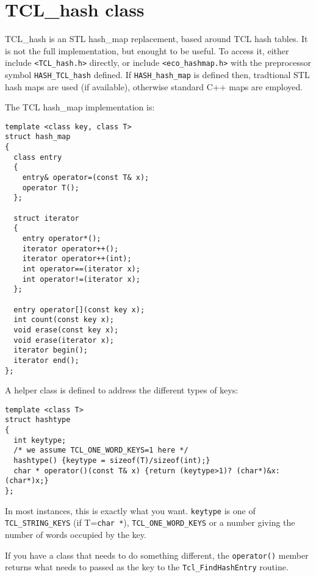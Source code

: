 \section{TCL_hash class}

TCL_hash is an
STL hash_map replacement, based around TCL hash tables. It is not the
full implementation, but enought to be useful. To access it, either
include \verb+<TCL_hash.h>+ directly, or include
\verb+<eco_hashmap.h>+ with the preprocessor symbol
\verb+HASH_TCL_hash+ defined. If \verb+HASH_hash_map+ is defined then,
tradtional STL hash maps are used (if available), otherwise standard
C++ maps are employed.

The TCL hash\_map implementation is:
\begin{verbatim}
template <class key, class T>
struct hash_map
{
  class entry 
  {
    entry& operator=(const T& x);
    operator T();
  };

  struct iterator
  {
    entry operator*();
    iterator operator++();
    iterator operator++(int); 
    int operator==(iterator x);
    int operator!=(iterator x);
  };

  entry operator[](const key x);
  int count(const key x);
  void erase(const key x);
  void erase(iterator x);
  iterator begin(); 
  iterator end();
};
\end{verbatim}

A helper class is defined to address the different types of keys:
\begin{verbatim}
template <class T>
struct hashtype
{ 
  int keytype;
  /* we assume TCL_ONE_WORD_KEYS=1 here */
  hashtype() {keytype = sizeof(T)/sizeof(int);}
  char * operator()(const T& x) {return (keytype>1)? (char*)&x: (char*)x;}
};
\end{verbatim}

In most instances, this is exactly what you want. \verb+keytype+ is one of
\verb+TCL_STRING_KEYS+ (if T=\verb+char *+), \verb+TCL_ONE_WORD_KEYS+
or a number giving the number of words occupied by the key.

If you have a class that needs to do something different, the
\verb+operator()+ member returns what needs to passed as the key to the
\verb+Tcl_FindHashEntry+ routine. 
